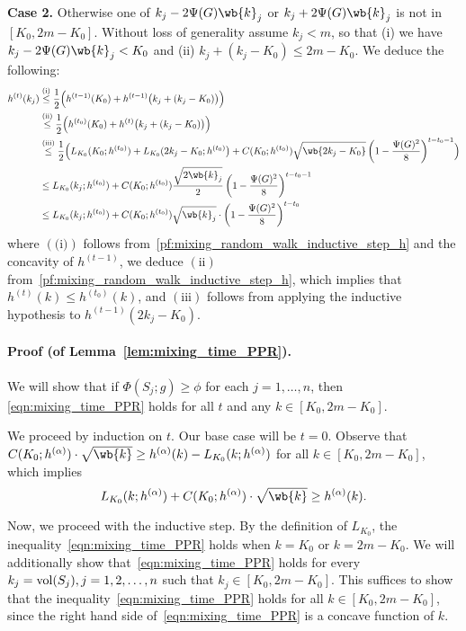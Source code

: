 	\textbf{Case 2.} Otherwise one of $k_j - 2 \Psi(G) \wb{k}_j$ or $k_j + 2 \Psi(G) \wb{k}_j$ is not in $[K_0,2m  - K_0]$. Without loss of generality assume $k_j < m$, so that (i) we have $k_j - 2 \Psi(G) \wb{k}_j < K_0$ and (ii) $k_j + (k_j - K_0) \leq 2m - K_0$. We deduce the following:
	\begin{align*}
	h^{(t)}(k_j) & \overset{(\textrm{i})}{\leq} \frac{1}{2}\Bigl(h^{(t - 1)}(K_0) + h^{(t - 1)}\bigl(k_j + (k_j - K_0)\bigr)\Bigr) \\
	& \overset{(\textrm{ii})}{\leq} \frac{1}{2}\Bigl(h^{(t_0)}(K_0) + h^{(t)}\bigl(k_j + (k_j - K_0)\bigr)\Bigr) \\
	& \overset{(\textrm{iii})}{\leq}\frac{1}{2}\Bigl(L_{K_0}(K_0;h^{(t_0)}) + L_{K_0}(2k_j - K_0; h^{(t_0)}\bigr) + C(K_0;h^{(t_0)})\sqrt{\wb{2k_j - K_0}}\left(1 - \frac{\Psi(G)^2}{8}\right)^{t - t_0 - 1}\Bigr) \\
	& \leq L_{K_0}(k_j; h^{(t_0)}) + C(K_0;h^{(t_0)}) \frac{\sqrt{2\wb{k}_j}}{2} \left(1 - \frac{\Psi(G)^2}{8}\right)^{t - t_0 - 1} \\
	& \leq L_{K_0}(k_j;h^{(t_0)}) + C(K_0;h^{(t_0)}) \sqrt{\wb{k}_j} \cdot \left(1 - \frac{\Psi(G)^2}{8}\right)^{t - t_0}
	\end{align*}
	where $(\textrm{(i)})$ follows from~\eqref{pf:mixing_random_walk_inductive_step_h} and the concavity of $h^{(t - 1)}$,  we deduce $(\textrm{ii})$ from~\eqref{pf:mixing_random_walk_inductive_step_h}, which implies that $h^{(t)}(k) \leq h^{(t_0)}(k)$, and $(\textrm{iii})$ follows from applying the inductive hypothesis to $h^{(t - 1)}(2k_j - K_0)$. 	

\paragraph{Proof (of Lemma~\ref{lem:mixing_time_PPR}).}
	We will show that if $\Phi(S_j; g) \geq \phi$ for each $j = 1,\ldots,n$, then \eqref{eqn:mixing_time_PPR} holds for all $t$ and any $k \in [K_0,2m - K_0]$.
	
	We proceed by induction on $t$. Our base case will be $t = 0$. Observe that $C(K_0;h^{(\alpha)}) \cdot \sqrt{\wb{k}} \geq h^{(\alpha)}(k) - L_{K_0}(k;h^{(\alpha)})$ for all $k \in [K_0,2m - K_0]$, which implies
	\begin{equation*}
	L_{K_0}(k;h^{(\alpha)}) + C(K_0;h^{(\alpha)}) \cdot \sqrt{\wb{k}} \geq h^{(\alpha)}(k).
	\end{equation*}
	
	Now, we proceed with the inductive step. By the definition of $L_{K_0}$, the inequality~\eqref{eqn:mixing_time_PPR} holds when $k = K_0$ or $k = 2m - K_0$. We will additionally show that~\eqref{eqn:mixing_time_PPR} holds for every $k_j = \mathrm{vol}(S_j), j = 1,2,\ldots,n$ such that $k_j \in [K_0, 2m - K_0]$. This suffices to show that the inequality~\eqref{eqn:mixing_time_PPR} holds for all $k \in [K_0,2m - K_0]$, since the right hand side of~\eqref{eqn:mixing_time_PPR} is a concave function of $k$.
	
